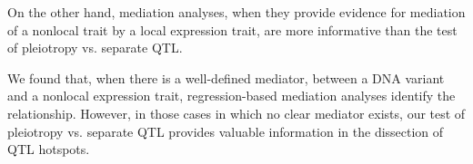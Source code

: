 \documentclass{article}
\begin{document}
On the other hand, mediation analyses, when they provide evidence for mediation of a nonlocal trait by a local expression trait, are more informative than the test of pleiotropy vs. separate QTL. 








We found that, when there is a well-defined mediator, between a DNA variant and a nonlocal expression trait, regression-based mediation analyses identify the relationship. However, in those cases in which no clear mediator exists, our test of pleiotropy vs. separate QTL provides valuable information in the dissection of QTL hotspots. 







\printbibliography
\end{document}
